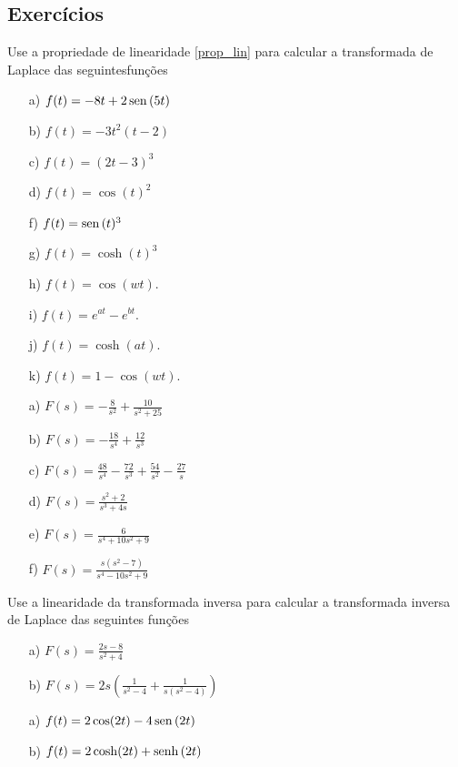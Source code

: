 \subsection*{Exercícios}
\begin{exer} Use a propriedade de linearidade \ref{prop_lin} para calcular a transformada de Laplace das seguintesfunções
 \begin{itemize}
  \item[a)] $f(t)=-8t+2\operatorname{sen}\,(5t)$ 
  \item[b)] $f(t)=-3t^2(t-2)$
  \item[c)] $f(t)=(2t-3)^3$
  \item[d)] $f(t)=\cos(t)^2$
  \item[f)] $f(t)=\operatorname{sen}\,(t)^3$
  \item[g)] $f(t)=\cosh(t)^3$
 \item[h)] $f(t)=\cos(wt)$.
 \item[i)] $f(t)=e^{at}-e^{bt}$.
 \item[j)] $f(t)=\cosh(at)$.
 \item[k)] $f(t)=1-\cos(wt)$.
  \end{itemize}
 \end{exer}
\begin{resp}
 \begin{itemize}
  \item[a)] $F(s)=-\frac{8}{s^2}+\frac{10}{s^2+25}$ 
  \item[b)] $F(s)=-\frac{18}{s^4}+\frac{12}{s^3}$
  \item[c)] $F(s)=\frac{48}{s^4}-\frac{72}{s^3}+\frac{54}{s^2}-\frac{27}{s}$
  \item[d)] $F(s)=\frac{s^2+2}{s^3+4s}$
  \item[e)] $F(s)=\frac{6}{s^4+10s^2+9}$
  \item[f)] $F(s)=\frac{s(s^2-7)}{s^4-10s^2+9}$
 \end{itemize}
\end{resp}
\begin{exer} Use a linearidade da transformada inversa para calcular a transformada inversa de Laplace das seguintes funções
 \begin{itemize}
  \item[a)] $F(s)=\frac{2s-8}{s^2+4}$ 
  \item[b)] $F(s)=2s\left(\frac{1}{s^2-4}+\frac{1}{s(s^2-4)}\right)$
 \end{itemize}
 \end{exer}
\begin{resp}
 \begin{itemize}
  \item[a)] $f(t)=2\cos(2t)-4\operatorname{sen}\,(2t)$
  \item[b)] $f(t)=2\cosh(2t)+\operatorname{senh}\,(2t)$
 \end{itemize}
\end{resp}
